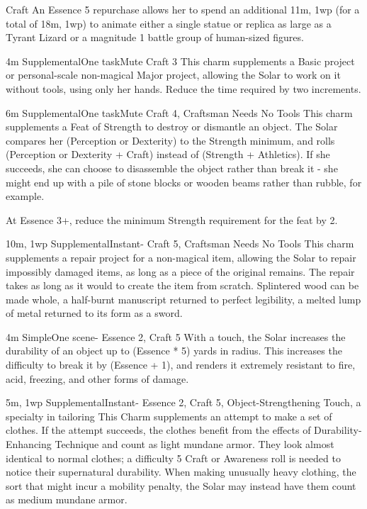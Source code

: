 \begin{Ability}{Craft}
  An Essence 5 repurchase allows her to spend an additional 11m, 1wp (for a total of 18m, 1wp) to animate either a single statue or replica as large as a Tyrant Lizard or a magnitude 1 battle group of human-sized figures.

  {4m}
  {Supplemental}{One task}{Mute}
  {Craft 3}
  This charm supplements a Basic project or personal-scale non-magical Major project, allowing the Solar to work on it without tools, using only her hands. Reduce the time required by two increments.

  {6m}
  {Supplemental}{One task}{Mute}
  {Craft 4, Craftsman Needs No Tools}
  This charm supplements a Feat of Strength to destroy or dismantle an object. The Solar compares her (Perception or Dexterity) to the Strength minimum, and rolls (Perception or Dexterity + Craft) instead of (Strength + Athletics). If she succeeds, she can choose to disassemble the object rather than break it - she might end up with a pile of stone blocks or wooden beams rather than rubble, for example.

  At Essence 3+, reduce the minimum Strength requirement for the feat by 2.

  {10m, 1wp}
  {Supplemental}{Instant}{-}
  {Craft 5, Craftsman Needs No Tools}
  This charm supplements a repair project for a non-magical item, allowing the Solar to repair impossibly damaged items, as long as a piece of the original remains. The repair takes as long as it would to create the item from scratch. Splintered wood can be made whole, a half-burnt manuscript returned to perfect legibility, a melted lump of metal returned to its form as a sword.

  {4m}
  {Simple}{One scene}{-}
  {Essence 2, Craft 5}
  With a touch, the Solar increases the durability of an object up to (Essence * 5) yards in radius. This increases the difficulty to break it by (Essence + 1), and renders it extremely resistant to fire, acid, freezing, and other forms of damage.

  {5m, 1wp}
  {Supplemental}{Instant}{-}
  {Essence 2, Craft 5, Object-Strengthening Touch, a specialty in tailoring}
  This Charm supplements an attempt to make a set of clothes. If the attempt succeeds, the clothes benefit from the effects of Durability-Enhancing Technique and count as light mundane armor. They look almost identical to normal clothes; a difficulty 5 Craft or Awareness roll is needed to notice their supernatural durability. When making unusually heavy clothing, the sort that might incur a mobility penalty, the Solar may instead have them count as medium mundane armor.


\end{Ability}
